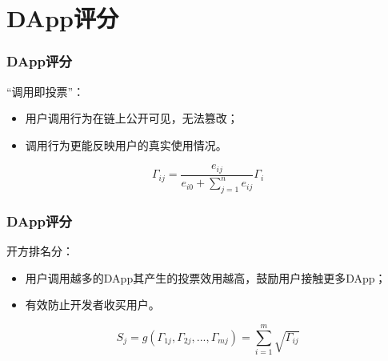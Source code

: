 \section{DApp评分}
\begin{frame}
\frametitle{DApp评分}
“调用即投票”：
\begin{itemize}
	\item 用户调用行为在链上公开可见，无法篡改；
	\item 调用行为更能反映用户的真实使用情况。
\end{itemize}
\[
\Gamma_{ij} = \frac{e_{ij}}{e_{i0}+\sum_{j=1}^n {e_{ij}}} \Gamma_i
\]
\end{frame}

\begin{frame}
\frametitle{DApp评分}
开方排名分：
\begin{itemize}
	\item 用户调用越多的DApp其产生的投票效用越高，鼓励用户接触更多DApp；
	\item 有效防止开发者收买用户。
\end{itemize}
\[
S_j = g(\Gamma_{1j},\Gamma_{2j},...,\Gamma_{mj}) = \sum_{i=1}^m \sqrt{\Gamma_{ij}}
\]
\end{frame}
